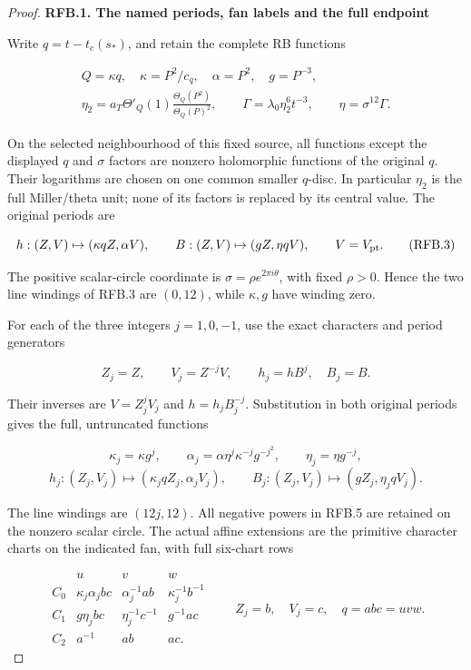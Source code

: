 \begin{proof}
\par

\medskip\noindent\textbf{RFB.1. The named periods, fan labels and the full endpoint}

\par\nobreak

Write \(q=t-t_c(s_*)\), and retain the complete RB functions

\[
 \begin{gathered}
 Q=\kappa q,\quad \kappa=P^2/c_q,\quad \alpha=P^2,\quad g=P^{-3},\\
 \eta_2=a_T\Theta'_Q(1)\frac{\Theta_Q(P^2)}{\Theta_Q(P)^2},\qquad
 \Gamma=\lambda_0\eta_2^6t^{-3},\qquad \eta=\sigma^{12}\Gamma .
 \end{gathered}
 \tag{RFB.2}
\]

On the selected neighbourhood of this fixed source, all functions
except the displayed \(q\) and \(\sigma\) factors are nonzero
holomorphic functions of the original \(q\). Their logarithms are
chosen on one common smaller \(q\)-disc. In particular \(\eta_2\)
is the full Miller/theta unit; none of its factors is replaced by
its central value. The original periods are

\[
 h:(Z,V)\mapsto(\kappa qZ,\alpha V),\qquad
 B:(Z,V)\mapsto(gZ,\eta qV),\qquad V=V_{\rm pt}.
 \tag{RFB.3}
\]

The positive scalar-circle coordinate is \(\sigma=\rho e^{2\pi i\theta}\),
with fixed \(\rho>0\). Hence the two line windings of RFB.3 are
\((0,12)\), while \(\kappa,g\) have winding zero.

For each of the three integers \(j=1,0,-1\), use the exact characters
and period generators

\[
 Z_j=Z,\qquad V_j=Z^{-j}V,\qquad h_j=hB^j,\quad B_j=B.
 \tag{RFB.4}
\]

Their inverses are \(V=Z_j^jV_j\) and \(h=h_jB_j^{-j}\). Substitution
in both original periods gives the full, untruncated functions

\[
 \kappa_j=\kappa g^j,\qquad
 \alpha_j=\alpha\eta^j\kappa^{-j}g^{-j^2},\qquad
 \eta_j=\eta g^{-j},
 \tag{RFB.5}
\]
\[
 h_j:(Z_j,V_j)\mapsto(\kappa_jqZ_j,\alpha_jV_j),\qquad
 B_j:(Z_j,V_j)\mapsto(gZ_j,\eta_jqV_j).
 \tag{RFB.6}
\]

The line windings are \((12j,12)\). All negative powers in RFB.5
are retained on the nonzero scalar circle. The actual affine
extensions are the primitive character charts on the indicated
fan, with full six-chart rows

\[
\begin{array}{c|ccc}
 &u&v&w\\\hline
 C_0&\kappa_j\alpha_jbc&\alpha_j^{-1}ab&\kappa_j^{-1}b^{-1}\\
 C_1&g\eta_jbc&\eta_j^{-1}c^{-1}&g^{-1}ac\\
 C_2&a^{-1}&ab&ac .
\end{array}
\qquad Z_j=b,\quad V_j=c,\quad q=abc=uvw.
 \tag{RFB.7}
\]


\end{proof}
